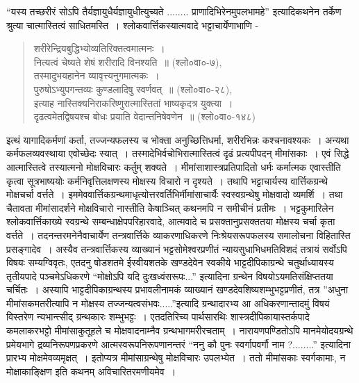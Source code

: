 {“यस्य तच्छरीरं सोऽपि तैर्यज्ञायुधैर्यज्ञायुधीत्युच्यते ........ प्राणादिभिरेनमुपलभामहे” इत्यादिकथनेन तर्केण श्रुत्या चात्मास्तित्वं साधितमस्ति~। श्लोकवार्त्तिकस्यात्मवादे भट्टाचार्येणाभाणि - 
\begin{verse}
शरीरेन्द्रियबुद्धिभ्योव्यतिरिक्तत्वमात्मनः~। \\
नित्यत्वं चेष्यते शेषं शरीरादि विनश्यति~॥ (श्लो०वा०-७),\\
तस्मादुभयहानेन व्यावृत्त्यनुगमात्मकः~। \\
पुरुषोऽभ्युपगन्तव्यः कुण्डलादिषु स्वर्णवत्~॥ (श्लो०वा०-२८), \\
इत्याह नास्तिक्यनिराकरिष्णुरात्मास्तितां भाष्यकृदत्र युक्त्या~। \\ 
दृढत्वमेतद्विषयश्च बोधः प्रयाति वेदान्तनिषेवणेन~॥ (श्लो०वा०-१४८) 
\end{verse}
इत्थं यागादिकर्मणां कर्ता, तज्जन्यफलस्य च भोक्ता अनुच्छित्तिधर्मा, शरीरभिन्नः कश्चना\-वश्यकः~। अन्यथा कर्मफलव्यवस्थाया एवोच्छेदः स्यात्~। तस्मादेभिर्वचोभिरात्मास्तित्वं दृढं प्रत्यपीपदन् मीमांसकाः~। एवं सिद्धे आत्मास्तित्वे तस्यात्मनो मोक्षविचारः कर्तुम् शक्यते~। मीमांसाशास्त्रप्रतिपादितो धर्मः कर्मात्मक एवास्तीति कृत्वा सूत्रभाष्ययोः कर्मनिवृत्तिलक्षणस्य मोक्षस्य विचारो न दृश्यते~। तथापि भट्टाचार्यस्य वार्त्तिकग्रन्थे मोक्षचर्चा वर्त्तते~। इममेव\-वार्त्तिकग्रन्थमाधृत्योत्तरवर्तिभिर्मीमांसाचार्यैः स्वस्वग्रन्थेषु मोक्षवादो व्यमर्शि~। तथा चैतावता मीमांसादर्शने मोक्षविचारो नास्तीति केेषाञ्चित् कथनमपि न समीचीनं प्रतीमः~। भट्टकुमारिलेन श्लोकवार्त्तिकाख्ये स्वग्रन्थे सम्बन्धाक्षेपपरिहारवादे, आत्मवादे च प्रसक्तानुप्रसक्ततया मोक्षस्य चर्चा कृता वर्त्तते~। 	तदनन्तरमनेनैवाचार्येण तन्त्रवार्त्तिके व्याकरणाधिकरणे निःश्रेयसरूप\-फलस्य समालोचना विहितास्ति प्रसङ्गादेव~। अस्यैव तन्त्रवार्त्तिकस्य व्याख्यानं भट्टसोमेश्वर\-प्रणीतं न्यायसुधाभिधमतिविशदं तत्रायं सर्वोऽपि विषयः सम्यग्विवृतः, एतदनु षोडशतमे \-ईस्वीयशतके खण्डदेवेन स्वकीये भाट्टदीपिकाग्रन्थे चतुर्थाध्यायस्य तृतीयपादे पञ्चमेऽधिकरणे “मोक्षोऽपि यदि दुःखध्वंसरूपः...” इत्यादिना ग्रन्थेन विषयोऽयमतिसंक्षिप्ततया चर्चितः~। अस्यापि भाट्टदीपिकाग्रन्थस्य प्रभावलीनामकं व्याख्यानं खण्डदेवशिष्यशम्भुभट्टप्रणीतं, तत्र ”अधुना मीमांसकमतरीत्यापि न मोक्षस्य तज्जन्यत्वसंभवः.....”इत्यादि ग्रन्थादारभ्य आ अधिकरणान्तादमुं विषयं विस्तरेण न्यभान्त्सीद् ग्रन्थकारः शम्भुभट्टः~। एतदतिरिच्य पार्थसारथिः शास्त्रदीपिकायास्तर्कपादे कमलाकरभट्टो  मीमांसाकुतूहले च मोक्षवादनाम्नैव ग्रन्थभागमरीरचताम्~। नारायणपण्डितोऽपि मानमेयोदयग्रन्थे प्रमेयभागे द्रव्यनिरूपणप्रकरणे आत्मस्वरूपनिरूपणानन्तरं “ननु कौ पुनः स्वर्गापवर्गौ नाम ?........” इत्यादिना प्रारभ्य मोक्षमेवव्यमृक्षत्~। इतोप्यत्र मीमांसाग्रन्थेषु मोक्षविचारः उपलभ्येत~। ततो मीमांसकाः स्वर्गकामाः, न मोक्षाकाङ्क्षिण इति कथनम् अविचारितरमणीयमेव~। 

}
